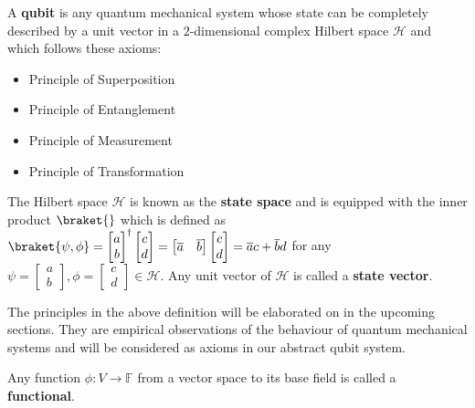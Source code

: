 \begin{samepage}
\begin{defn}
    A \textbf{qubit} is any quantum mechanical system whose state can be completely described by a unit vector in a $2$-dimensional complex Hilbert space $\mathcal{H}$ and which follows these axioms: 
\begin{itemize}
    \item Principle of Superposition
    \item Principle of Entanglement
    \item Principle of Measurement
    \item Principle of Transformation
\end{itemize}
    The Hilbert space $\mathcal{H}$ is known as the \textbf{state space} and is equipped with the inner product $\braket{}$ which is defined as $\braket{\psi, \phi} = \begin{bmatrix} a \\ b \end{bmatrix}^\dagger \begin{bmatrix} c \\ d \end{bmatrix} = \begin{bmatrix} \overline{a} & \overline{b} \end{bmatrix} \begin{bmatrix} c \\ d \end{bmatrix} = \overline{a} c + \overline{b} d$ for any $\psi = \begin{bmatrix} a\\b\end{bmatrix}, \phi = \begin{bmatrix} c \\ d \end{bmatrix} \in \mathcal{H}$. Any unit vector of $\mathcal{H}$ is called a \textbf{state vector}.
\end{defn}

The principles in the above definition will be elaborated on in the upcoming sections.
They are empirical observations of the behaviour of quantum mechanical systems and will be considered as axioms in our abstract qubit system.
\end{samepage}


\begin{defn}
    Any function $\phi: V \to \mathbb{F}$ from a vector space to its base field is called a \textbf{functional}. 
\end{defn}

